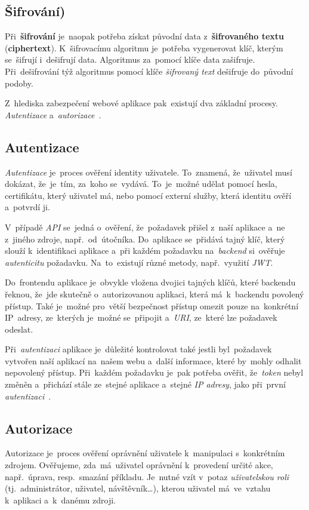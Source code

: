 \documentclass[11pt,a4paper]{report}
\begin{document}
            \subsection{Šifrování)}
                Při~\textbf{šifrování} je~naopak potřeba získat původní data z~\textbf{šifrovaného textu} (\textbf{ciphertext}). K~šifrovacímu algoritmu je~potřeba vygenerovat klíč, kterým se~šifrují i~dešifrují data. Algoritmus za~pomocí klíče data zašifruje. Při~dešifrování týž algoritmus pomocí klíče \emph{šifrovaný text} dešifruje do~původní podoby.

                Z~hlediska zabezpečení webové aplikace pak~existují dva základní procesy. \emph{Autentizace} a~\emph{autorizace}~\cite{graham2021ethical}.

            \subsection{Autentizace}
                \emph{Autentizace} je~proces ověření identity uživatele. To~znamená, že~uživatel musí dokázat, že~je~tím, za~koho se~vydává. To~je~možné udělat pomocí hesla, certifikátu, který uživatel má, nebo pomocí externí služby, která identitu ověří a~potvrdí ji.
                
                V~případě \emph{API} se~jedná o~ověření, že~požadavek přišel z~naší aplikace a~ne z~jiného zdroje, např.~od~útočníka. Do~aplikace se~přidává tajný klíč, který slouží k~identifikaci aplikace a~při každém požadavku na~\emph{backend} si~ověřuje \emph{autenticitu} požadavku. Na~to~existují různé metody, např.~využití \emph{JWT}.
                
                Do~frontendu aplikace je~obvykle vložena dvojici tajných klíčů, které backendu řeknou, že~jde skutečně o~autorizovanou aplikaci, která má~k~backendu povolený přístup. Také je~možné pro~větší bezpečnost přístup omezit pouze na~konkrétní IP~adresy, ze~kterých je~možné se~připojit a~\emph{URI}, ze~které lze požadavek odeslat.

                Při~\emph{autentizaci} aplikace je~důležité kontrolovat také jestli byl~požadavek vytvořen naší aplikací na~našem webu a~další informace, které by~mohly odhalit nepovolený přístup. Při~každém požadavku je~pak potřeba ověřit, že~\emph{token} nebyl změněn a~přichází stále ze~stejné aplikace a~stejné \emph{IP adresy}, jako při~první \emph{autentizaci}~\cite{graham2021ethical}.
            
            \subsection{Autorizace}
                Autorizace je~proces ověření oprávnění uživatele k~manipulaci s~konkrétním zdrojem. Ověřujeme, zda~má~uživatel oprávnění k~provedení určité akce, např.~úprava, resp.~smazání příkladu. Je~nutné vzít v~potaz \emph{uživatelskou roli} (tj.~administrátor, uživatel, návštěvník\dots), kterou uživatel má~ve~vztahu k~aplikaci a~k~danému zdroji.
                
\end{document}
